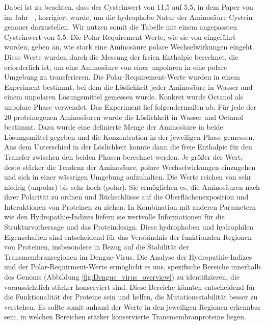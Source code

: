 \documentclass[german,version-2022-01]{uzl-thesis}
\begin{document}
Dabei ist zu beachten, dass der Cysteinwert von 11,5 auf 5,5, in dem Paper  von \citeauthor{woese_evolution_1973} im Jahr \citeyear{woese_evolution_1973}~\cite{woese_evolution_1973}, korrigiert wurde, um die hydrophobe Natur der Aminos\"aure Cystein genauer darzustellen. Wir nutzen somit die Tabelle mit einem angepassten Cysteinwert von 5,5. 
Die Polar-Requirement-Werte, wie sie von \citeauthor{woese_fundamental_1966} eingef\"uhrt wurden, geben an, wie stark eine Aminos\"aure polare Wechselwirkungen eingeht. Diese Werte wurden durch die Messung der freien Enthalpie berechnet, die erforderlich ist, um eine Aminos\"aure von einer unpolaren in eine polare Umgebung zu transferieren. Die Polar-Requirement-Werte wurden in einem Experiment bestimmt, bei dem die L\"oslichkeit jeder Aminos\"aure in Wasser und einem unpolaren L\"osungsmittel gemessen wurde. Konkret wurde Octanol als unpolare Phase verwendet. Das Experiment lief folgenderma\ss{}en ab: F\"ur jede der 20 proteinogenen Aminos\"auren wurde die L\"oslichkeit in Wasser und Octanol bestimmt. Dazu wurde eine definierte Menge der Aminos\"aure in beide L\"osungsmittel gegeben und die Konzentration in der jeweiligen Phase gemessen. Aus dem Unterschied in der L\"oslichkeit konnte dann die freie Enthalpie f\"ur den Transfer zwischen den beiden Phasen berechnet werden. Je gr\"o\ss{}er der Wert, desto st\"arker die Tendenz der Aminos\"aure, polare Wechselwirkungen einzugehen und sich in einer w\"assrigen Umgebung aufzuhalten. Die Werte reichen von sehr niedrig (unpolar) bis sehr hoch (polar). Sie erm\"oglichen es, die Aminos\"auren nach ihrer Polarit\"at zu ordnen und R\"uckschl\"usse auf die Oberfl\"achenexposition und Interaktionen von Proteinen zu ziehen. In Kombination mit anderen Parametern wie den Hydropathie-Indizes liefern sie wertvolle Informationen f\"ur die Strukturvorhersage und das Proteindesign. Diese hydrophoben und hydrophilen Eigenschaften sind entscheidend f\"ur das Verst\"andnis der funktionalen Regionen von Proteinen, insbesondere in Bezug auf die Stabilit\"at der Transmembranregionen im Dengue-Virus. Die Analyse der Hydropathie-Indizes und der Polar-Requirment-Werte erm\"oglicht es uns, spezifische Bereiche innerhalb des Genoms (Abbildung \ref{fig:Dengue_virus_overview}) zu identifizieren, die voraussichtlich st\"arker konserviert sind. Diese Bereiche k\"onnten entscheidend f\"ur die Funktionalit\"at der Proteine sein und helfen, die Mutationsstabilit\"at besser zu verstehen. Es sollte somit anhand der Werte in den jeweiligen Regionen erkennbar sein, in welchen Bereichen st\"arker konservierte Transmembranproteine liegen.
\end{document}
